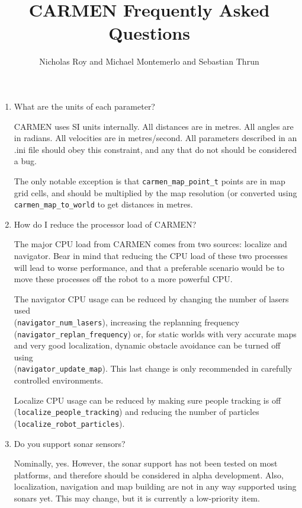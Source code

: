 \documentclass{article}
\title{CARMEN Frequently Asked Questions}
\author{Nicholas Roy and Michael Montemerlo and Sebastian Thrun}
\begin{document}
\maketitle

\begin{enumerate}

\item What are the units of each parameter?
  
  CARMEN uses SI units internally. All distances are in metres. All angles are
  in radians. All velocities are in metres/second. All parameters described in
  an .ini file should obey this constraint, and any that do not should be
  considered a bug. 

  The only notable exception is that \verb!carmen_map_point_t! points are in
  map grid cells, and should be multiplied by the map resolution (or converted
  using \verb!carmen_map_to_world! to get distances in metres. 

\item How do I reduce the processor load of CARMEN?

  The major CPU load from CARMEN comes from two sources: localize and
  navigator. Bear in mind that reducing the CPU load of these two processes
  will lead to worse performance, and that a preferable scenario would be to
  move these processes off the robot to a more powerful CPU. 

  The navigator CPU usage can be reduced by changing the number of lasers used
  \\
  (\verb!navigator_num_lasers!), increasing the replanning frequency
  (\verb!navigator_replan_frequency!) or, for static worlds with very accurate
  maps and very good localization, dynamic obstacle avoidance can be turned
  off using \\ (\verb!navigator_update_map!). This last change is only
  recommended in carefully controlled environments.

  Localize CPU usage can be reduced by making sure people tracking is off
  (\verb!localize_people_tracking!) and reducing the number of particles
  (\verb!localize_robot_particles!). 

\item Do you support sonar sensors?

  Nominally, yes. However, the sonar support has not been tested on most
  platforms, and therefore should be considered in alpha development. Also,
  localization, navigation and map building are not in any way supported using
  sonars yet. This may change, but it is currently a low-priority item.


\end{enumerate}
\end{document}
